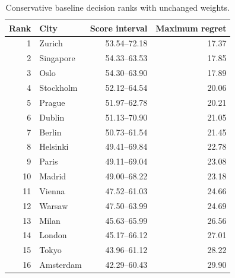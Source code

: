 \begin{table}[htbp]\centering
\caption{Conservative baseline decision ranks with unchanged weights.}\label{tab:baseline}
\begin{tabular}{rlrr}\toprule
Rank & City & Score interval & Maximum regret\\\midrule
1 & Zurich & 53.54--72.18 & 17.37 \\
2 & Singapore & 54.33--63.53 & 17.85 \\
3 & Oslo & 54.30--63.90 & 17.89 \\
4 & Stockholm & 52.12--64.54 & 20.06 \\
5 & Prague & 51.97--62.78 & 20.21 \\
6 & Dublin & 51.13--70.90 & 21.05 \\
7 & Berlin & 50.73--61.54 & 21.45 \\
8 & Helsinki & 49.41--69.84 & 22.78 \\
9 & Paris & 49.11--69.04 & 23.08 \\
10 & Madrid & 49.00--68.22 & 23.18 \\
11 & Vienna & 47.52--61.03 & 24.66 \\
12 & Warsaw & 47.50--63.99 & 24.69 \\
13 & Milan & 45.63--65.99 & 26.56 \\
14 & London & 45.17--66.12 & 27.01 \\
15 & Tokyo & 43.96--61.12 & 28.22 \\
16 & Amsterdam & 42.29--60.43 & 29.90 \\
\bottomrule\end{tabular}\end{table}
